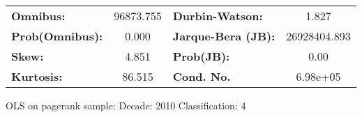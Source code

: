 \begin{center}
\begin{tabular}{lccccc}
\bottomrule
\end{tabular}
\begin{tabular}{lclc}
\textbf{Omnibus:}       & 96873.755 & \textbf{  Durbin-Watson:     } &      1.827    \\
\textbf{Prob(Omnibus):} &    0.000  & \textbf{  Jarque-Bera (JB):  } & 26928404.893  \\
\textbf{Skew:}          &    4.851  & \textbf{  Prob(JB):          } &       0.00    \\
\textbf{Kurtosis:}      &   86.515  & \textbf{  Cond. No.          } &   6.98e+05    \\
\bottomrule
\end{tabular}
\end{center}
\break
OLS on pagerank sample: Decade: 2010 Classification: 4
